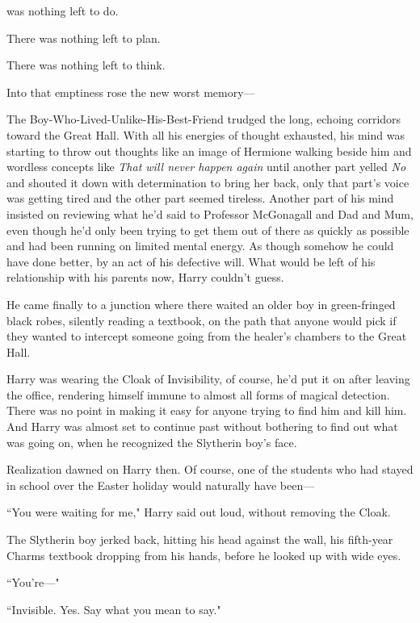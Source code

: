 
 was nothing left to do.

\hplettrineextrapara
There was nothing left to plan.

There was nothing left to think.

Into that emptiness rose the new worst memory---

The Boy-Who-Lived-Unlike-His-Best-Friend trudged the long, echoing corridors toward the Great Hall. With all his energies of thought exhausted, his mind was starting to throw out thoughts like an image of Hermione walking beside him and wordless concepts like \emph{That will never happen again} until another part yelled \emph{No} and shouted it down with determination to bring her back, only that part's voice was getting tired and the other part seemed tireless. Another part of his mind insisted on reviewing what he'd said to Professor McGonagall and Dad and Mum, even though he'd only been trying to get them out of there as quickly as possible and had been running on limited mental energy. As though somehow he could have done better, by an act of his defective will. What would be left of his relationship with his parents now, Harry couldn't guess.

He came finally to a junction where there waited an older boy in green-fringed black robes, silently reading a textbook, on the path that anyone would pick if they wanted to intercept someone going from the healer's chambers to the Great Hall.

Harry was wearing the Cloak of Invisibility, of course, he'd put it on after leaving the office, rendering himself immune to almost all forms of magical detection. There was no point in making it easy for anyone trying to find him and kill him. And Harry was almost set to continue past without bothering to find out what was going on, when he recognized the Slytherin boy's face.

Realization dawned on Harry then. Of course, one of the students who had stayed in school over the Easter holiday would naturally have been---

``You were waiting for me," Harry said out loud, without removing the Cloak.

The Slytherin boy jerked back, hitting his head against the wall, his fifth-year Charms textbook dropping from his hands, before he looked up with wide eyes.

``You're---"

``Invisible. Yes. Say what you mean to say."

